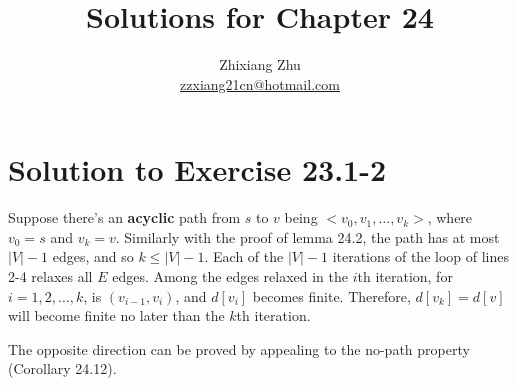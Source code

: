 \documentclass[a4paper, fleqn]{article}
\title{Solutions for Chapter 24}
\author{Zhixiang Zhu  \\\href{mailto:zzxiang21cn@hotmail.com}{zzxiang21cn@hotmail.com}}
\begin{document}
\maketitle

\section*{Solution to Exercise 23.1-2}

Suppose there's an {\bf acyclic} path from $s$ to $v$ being $<v_0, v_1, \ldots, v_k>$,
where $v_0 = s$ and $v_k = v$. Similarly with the proof of lemma 24.2, the path has at
most $|V| - 1$ edges, and so $k \leq |V| - 1$. Each of the $|V| - 1$ iterations of the
\For loop of lines 2-4 relaxes all $E$ edges. Among the edges relaxed in the $i$th
iteration, for $i = 1, 2, \ldots, k$, is $(v_{i - 1}, v_i)$, and $d[v_i]$ becomes finite.
Therefore, $d[v_k] = d[v]$ will become finite no later than the $k$th iteration.

The opposite direction can be proved by appealing to the no-path property (Corollary
24.12).
\end{document}

